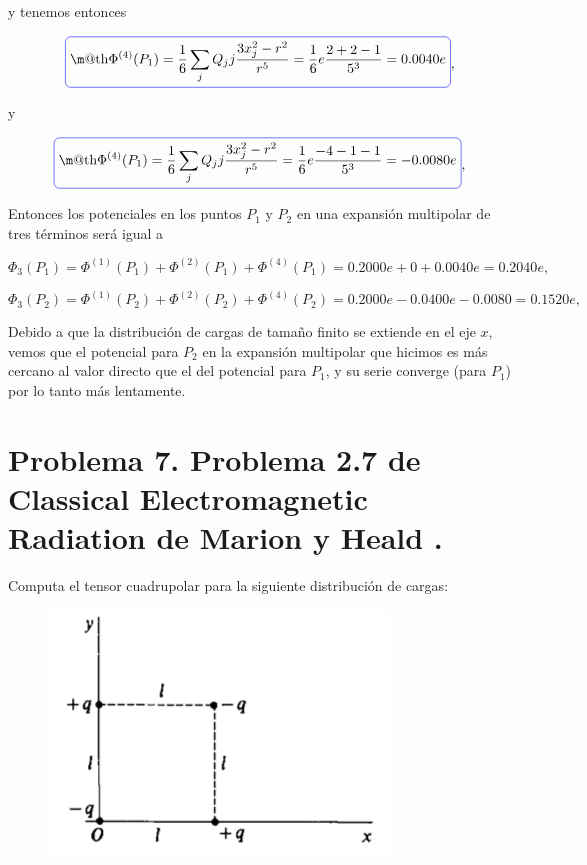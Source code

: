 \documentclass[a4paper,11pt]{article}
\makeatletter
\numberwithin{equation}{section}
\newcommand*{\boxcolor}{blue}
\renewcommand{\boxed}[1]{\textcolor{\boxcolor}{%
\tikz[baseline={([yshift=-1ex]current bounding box.center)}] \node [rectangle, minimum width=1ex,rounded corners,draw] {\normalcolor\m@th$\displaystyle#1$};}}
\makeatother
\begin{document}
y tenemos entonces 

\begin{equation}
 \boxed{\Phi^{(4)}(P_1) = \frac{1}{6}\sum_j Q_jj \frac{3x_j^2 - r^2}{r^5} = 
 \frac{1}{6}e\frac{2 + 2 - 1}{5^3} = 0.0040 e},
\end{equation}

y 

\begin{equation}
 \boxed{\Phi^{(4)}(P_1) = \frac{1}{6}\sum_j Q_jj \frac{3x_j^2 - r^2}{r^5} = 
 \frac{1}{6}e\frac{-4 -1 - 1}{5^3} = -0.0080 e},
\end{equation}

Entonces los potenciales en los puntos $P_1$ y $P_2$ en una expansión multipolar de 
tres términos será igual a 

\begin{equation}
 \Phi_3(P_1) = \Phi^{(1)}(P_1) + \Phi^{(2)}(P_1) + \Phi^{(4)}(P_1) 
 = 0.2000 e + 0 + 0.0040 e = 0.2040 e,
\end{equation}

\begin{equation}
 \Phi_3(P_2) = \Phi^{(1)}(P_2) + \Phi^{(2)}(P_2) + \Phi^{(4)}(P_2)
 = 0.2000 e - 0.0400e - 0.0080 = 0.1520 e,
\end{equation}

Debido a que la distribución de cargas de tamaño finito se extiende en el eje $x$, 
vemos que el potencial para $P_2$ en la expansión multipolar que hicimos es más
cercano al valor directo que el del potencial para $P_1$, y su serie converge (para 
$P_1$) por lo tanto más lentamente.

\newpage

\section{Problema 7. Problema 2.7 de Classical Electromagnetic Radiation
de Marion y Heald \cite{marion2}.}

Computa el tensor cuadrupolar para la siguiente distribución de cargas:

\begin{figure}[H]
\center
 \includegraphics[scale=0.6]{problema7fig1}
\end{figure}
\end{document}
